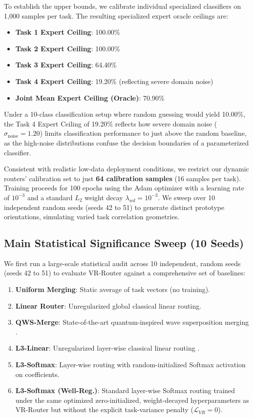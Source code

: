 To establish the upper bounds, we calibrate individual specialized classifiers on 1,000 samples per task. The resulting specialized expert oracle ceilings are:
\begin{itemize}
    \item \textbf{Task 1 Expert Ceiling}: 100.00\%
    \item \textbf{Task 2 Expert Ceiling}: 100.00\%
    \item \textbf{Task 3 Expert Ceiling}: 64.40\%
    \item \textbf{Task 4 Expert Ceiling}: 19.20\% (reflecting severe domain noise)
    \item \textbf{Joint Mean Expert Ceiling (Oracle)}: 70.90\%
\end{itemize}
Under a 10-class classification setup where random guessing would yield 10.00\%, the Task 4 Expert Ceiling of 19.20\% reflects how severe domain noise ($\sigma_{\text{noise}} = 1.20$) limits classification performance to just above the random baseline, as the high-noise distributions confuse the decision boundaries of a parameterized classifier.

Consistent with realistic low-data deployment conditions, we restrict our dynamic routers' calibration set to just \textbf{64 calibration samples} (16 samples per task). Training proceeds for 100 epochs using the Adam optimizer with a learning rate of $10^{-3}$ and a standard $L_2$ weight decay $\lambda_{wd} = 10^{-3}$. We sweep over 10 independent random seeds (seeds 42 to 51) to generate distinct prototype orientations, simulating varied task correlation geometries.

\subsection{Main Statistical Significance Sweep (10 Seeds)}
We first run a large-scale statistical audit across 10 independent, random seeds (seeds 42 to 51) to evaluate VR-Router against a comprehensive set of baselines:
\begin{enumerate}
    \item \textbf{Uniform Merging}: Static average of task vectors (no training).
    \item \textbf{Linear Router}: Unregularized global classical linear routing.
    \item \textbf{QWS-Merge}: State-of-the-art quantum-inspired wave superposition merging \cite{qwsmerge2025}.
    \item \textbf{L3-Linear}: Unregularized layer-wise classical linear routing \cite{muqeeth2023l3}.
    \item \textbf{L3-Softmax}: Layer-wise routing with random-initialized Softmax activation on coefficients.
    \item \textbf{L3-Softmax (Well-Reg.)}: Standard layer-wise Softmax routing trained under the same optimized zero-initialized, weight-decayed hyperparameters as VR-Router but without the explicit task-variance penalty ($\mathcal{L}_{VR} = 0$).
\end{enumerate}

